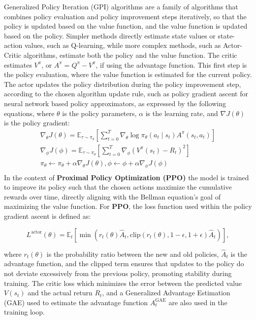 Generalized Policy Iteration (GPI) algorithms are a family of algorithms that combines policy evaluation and policy improvement steps iteratively,
so that the policy is updated based on the value function, and the value function is updated based on the policy.
Simpler methods directly estimate state values or state-action values, such as Q-learning, while more complex methods,
such as Actor-Critic algorithms, estimate both the policy and the value function.
The critic estimates $V^\pi$, or $A^{\pi} = Q^{\pi} - V^{\pi}$, if using the advantage function.
This first step is the policy evaluation, where the value function is estimated for the current policy.
The actor updates the policy distribution during the policy improvement step,
according to the chosen algorithm update rule, such as policy gradient ascent for neural network based policy approximators,
as expressed by the following equations,
where $\theta$ is the policy parameters, $\alpha$ is the learning rate, and $\nabla J(\theta)$ is the policy gradient:
\begin{gather*}
    \nabla_{\theta} J(\theta) = \mathbb{E}_{\tau \sim \pi_{\theta}} \left[ \sum_{t=0}^{T} \nabla_{\theta} \log \pi_{\theta}(a_t \mid s_t) A^{\pi}(s_t, a_t) \right]\\
    \nabla_{\phi} J(\phi) = \mathbb{E}_{\tau \sim \pi_{\theta}} \left[ \sum_{t=0}^{T} \nabla_{\phi} \left( V^{\pi}(s_t) - R_t \right)^2 \right]\\
    \pi_{\theta} \leftarrow \pi_{\theta} + \alpha \nabla_{\theta} J(\theta), \phi \leftarrow \phi + \alpha \nabla_{\phi} J(\phi)\\
\end{gather*}
In the context of \textbf{Proximal Policy Optimization (PPO)}
the model is trained to improve its policy such that the chosen actions maximize the cumulative rewards over time,
directly aligning with the Bellman equation's goal of maximizing the value function.
For \textbf{PPO}, the loss function used within the policy gradient ascent is defined as:

\[
    L^{\text{actor}}(\theta) = \mathbb{E}_t \left[ \min \left( r_t(\theta) \hat{A}_t, \text{clip}(r_t(\theta), 1 - \epsilon, 1 + \epsilon) \hat{A}_t \right) \right],
\]

where \( r_t(\theta) \) is the probability ratio between the new and old policies, \( \hat{A}_t \) is the advantage function,
and the clipped term ensures that updates to the policy do not deviate excessively from the previous policy, promoting stability during training.
The critic loss which minimizes the error between the predicted value \( V(s_t) \) and the actual return \( R_t \),
and a Generalized Advantage Estimation (GAE) used to estimate the advantage function \( A^{\text{GAE}}_t \) are also used in the training loop.

